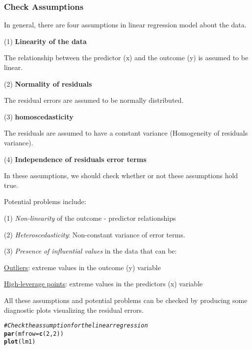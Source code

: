 \documentclass{article}\usepackage[]{graphicx}\usepackage[]{xcolor}
\makeatletter
\newcommand{\hlnum}[1]{\textcolor[rgb]{0.686,0.059,0.569}{#1}}%
\newcommand{\hlcom}[1]{\textcolor[rgb]{0.678,0.584,0.686}{\textit{#1}}}%
\newcommand{\hlstd}[1]{\textcolor[rgb]{0.345,0.345,0.345}{#1}}%
\newcommand{\hlkwc}[1]{\textcolor[rgb]{0.333,0.667,0.333}{#1}}%
\newcommand{\hlkwd}[1]{\textcolor[rgb]{0.737,0.353,0.396}{\textbf{#1}}}%
\newenvironment{kframe}{%
 \def\at@end@of@kframe{}%
 \ifinner\ifhmode%
  \def\at@end@of@kframe{\end{minipage}}%
  \begin{minipage}{\columnwidth}%
 \fi\fi%
 \def\FrameCommand##1{\hskip\@totalleftmargin \hskip-\fboxsep
 \colorbox{shadecolor}{##1}\hskip-\fboxsep
     \hskip-\linewidth \hskip-\@totalleftmargin \hskip\columnwidth}%
 \MakeFramed {\advance\hsize-\width
   \@totalleftmargin\z@ \linewidth\hsize
   \@setminipage}}%
 {\par\unskip\endMakeFramed%
 \at@end@of@kframe}
\newenvironment{knitrout}{}{} %
\makeatother
\begin{document}
\subsubsection*{Check Assumptions}

In general, there are four assumptions in linear regression model about the data.

(1) \textbf{Linearity of the data}

The relationship between the predictor (x) and the outcome (y) is assumed to be linear.

(2) \textbf{Normality of residuals}

The residual errors are assumed to be normally distributed.

(3) \textbf{homoscedasticity}

The residuals are assumed to have a constant variance (Homogeneity of residuals variance).

(4) \textbf{Independence of residuals error terms}

In these assumptions, we should check whether or not these assumptions hold true. 

Potential problems include:

(1) \emph{Non-linearity} of the outcome - predictor relationships

(2) \emph{Heteroscedasticity}: Non-constant variance of error terms.

(3) \emph{Presence of influential values} in the data that can be:

\underline{Outliers}: extreme values in the outcome (y) variable

\underline{High-leverage points}: extreme values in the predictors (x) variable


All these assumptions and potential problems can be checked by producing some diagnostic plots visualizing the residual errors.

\begin{knitrout}
\color{fgcolor}\begin{kframe}
\begin{alltt}
\hlcom{# Check the assumption for the linear regression}
\hlkwd{par}\hlstd{(}\hlkwc{mfrow} \hlstd{=} \hlkwd{c}\hlstd{(}\hlnum{2}\hlstd{,} \hlnum{2}\hlstd{))}
\hlkwd{plot}\hlstd{(lm1)}
\end{alltt}


{\ttfamily\noindent\bfseries\color{errorcolor}{\#\# Error in h(simpleError(msg, call)): error in evaluating the argument 'x' in selecting a method for function 'plot': object 'lm1' not found}}\end{kframe}
\end{knitrout}
\end{document}
